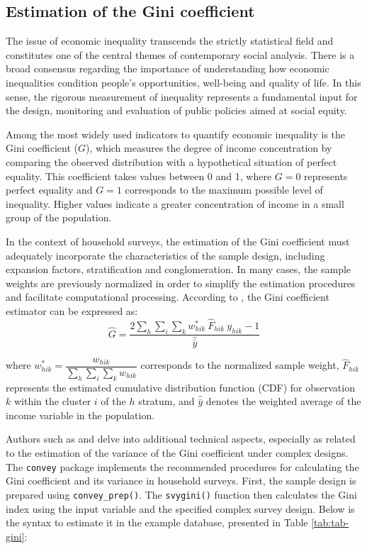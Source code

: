\documentclass[
  english,
  12pt,
]{book}
\begin{document}
\subsection{Estimation of the Gini coefficient}\label{estimacion-del-coeficiente-de-gini}

The issue of economic inequality transcends the strictly statistical field and constitutes one of the central themes of contemporary social analysis. There is a broad consensus regarding the importance of understanding how economic inequalities condition people's opportunities, well-being and quality of life. In this sense, the rigorous measurement of inequality represents a fundamental input for the design, monitoring and evaluation of public policies aimed at social equity.

Among the most widely used indicators to quantify economic inequality is the Gini coefficient (\(G\)), which measures the degree of income concentration by comparing the observed distribution with a hypothetical situation of perfect equality. This coefficient takes values between 0 and 1, where \(G = 0\) represents perfect equality and \(G = 1\) corresponds to the maximum possible level of inequality. Higher values indicate a greater concentration of income in a small group of the population.

In the context of household surveys, the estimation of the Gini coefficient must adequately incorporate the characteristics of the sample design, including expansion factors, stratification and conglomeration. In many cases, the sample weights are previously normalized in order to simplify the estimation procedures and facilitate computational processing. According to \citet{binder1995}, the Gini coefficient estimator can be expressed as:
\[
\hat{G} = \frac{2\sum_{h}\sum_{i}\sum_{k}w_{hik}^{*}
\ \hat{F}_{hik} \ y_{hik}-1}{\hat{\bar{y}}}
\]

where \(w_{hik}^{*}=\dfrac{w_{hik}}{\sum_{h}\sum_{i}\sum_{k}w_{hik}}\) corresponds to the normalized sample weight, \(\hat{F}_{hik}\) represents the estimated cumulative distribution function (CDF) for observation \(k\) within the cluster \(i\) of the \(h\) stratum, and \(\hat{\bar{y}}\) denotes the weighted average of the income variable in the population.

Authors such as \citet{osier2009variance} and \citet{langel2013variance} delve into additional technical aspects, especially as related to the estimation of the variance of the Gini coefficient under complex designs. The \texttt{convey} \citep{convey2024} package implements the recommended procedures for calculating the Gini coefficient and its variance in household surveys. First, the sample design is prepared using \texttt{convey\_prep()}. The \texttt{svygini()} function then calculates the Gini index using the input variable and the specified complex survey design. Below is the syntax to estimate it in the example database, presented in Table \ref{tab:tab-gini}:
\end{document}
